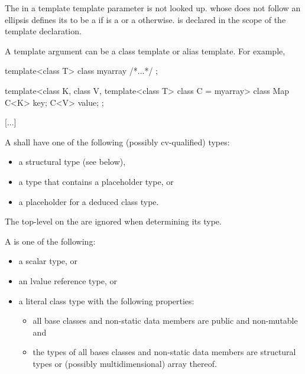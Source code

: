 \documentclass{wg21}
\begin{document}
\begin{addedblock}
The  in a template template parameter is not looked up.
 whose  does not follow an ellipsis defines its
 to be a   if  is a 
or a   otherwise.
 is declared in the scope of the template declaration.
\end{addedblock}

\begin{note}
A template argument can be a class template or alias template.
For example,

\begin{codeblock}
    template<class T> class myarray { /*...*/ };

    template<class K, class V, template<class T> class C = myarray>
    class Map {
        C<K> key;
        C<V> value;
    };
\end{codeblock}
\end{note}


\textcolor{noteclr}{[...]}

\pnum
A  
shall have one of the following (possibly cv-qualified) types:
\begin{itemize}
    \item a structural type (see below),
    \item a type that contains a placeholder type, or
    \item a placeholder for a deduced class type.
\end{itemize}
The top-level
on the
are ignored when determining its type.

\pnum
\label{term.structural.type}%
A  is one of the following:
\begin{itemize}
\item a scalar type, or
\item an lvalue reference type, or
\item a literal class type with the following properties:
\begin{itemize}
    \item
    all base classes and non-static data members are public and non-mutable and
    \item
    the types of all bases classes and non-static data members are
    structural types or (possibly multidimensional) array thereof.
\end{itemize}
\end{itemize}
\end{document}
